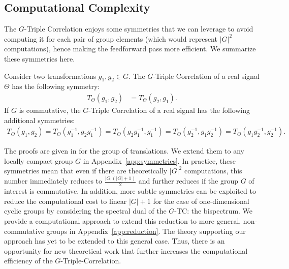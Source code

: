 \subsection{Computational Complexity}

The $G$-Triple Correlation enjoys some symmetries that we can leverage to avoid computing it for each pair of group elements (which would represent $|G|^2$ computations), hence making the feedforward pass more efficient. We summarize these symmetries here.
\begin{proposition}
Consider two transformations $g_1, g_2 \in G$. The $G$-Triple Correlation of a real signal $\Theta$ has the following symmetry:
\begin{align*}
     T_\Theta(g_1, g_2) &= T_\Theta(g_2, g_1).
\end{align*}
If $G$ is commutative, the $G$-Triple Correlation of a real signal has the following additional symmetries:
\begin{align*}
     T_\Theta(g_1, g_2)
     = T_\Theta(g^{-1}_1, g_2g^{-1}_1)
     = T_\Theta(g_2g^{-1}_1, g^{-1}_1)
     = T_\Theta(g^{-1}_2, g_1g^{-1}_2)
     = T_\Theta(g_1g^{-1}_2, g^{-1}_2).
\end{align*}
\end{proposition}


The proofs are given in \cite{nikias1993signal} for the group of translations. We extend them to any locally compact group $G$ in Appendix~\ref{app:symmetries}. In practice, these symmetries mean that even if there are theoretically $|G|^2$ computations, this number immediately reduces to $\frac{|G|(|G|+1)}{2}$ and further reduces if the group $G$ of interest is commutative. In addition, more subtle symmetries can be exploited to reduce the computational cost to linear $|G|+1$ for the case of one-dimensional cyclic groups \cite{kondor2008thesis} by considering the spectral dual of the $G$-TC: the bispectrum. We provide a computational approach to extend this reduction to more general, non-commutative groups in Appendix~\ref{app:reduction}. The theory supporting our approach has yet to be extended to this general case. Thus, there is an opportunity for new theoretical work that further increases the computational efficiency of the $G$-Triple-Correlation.


